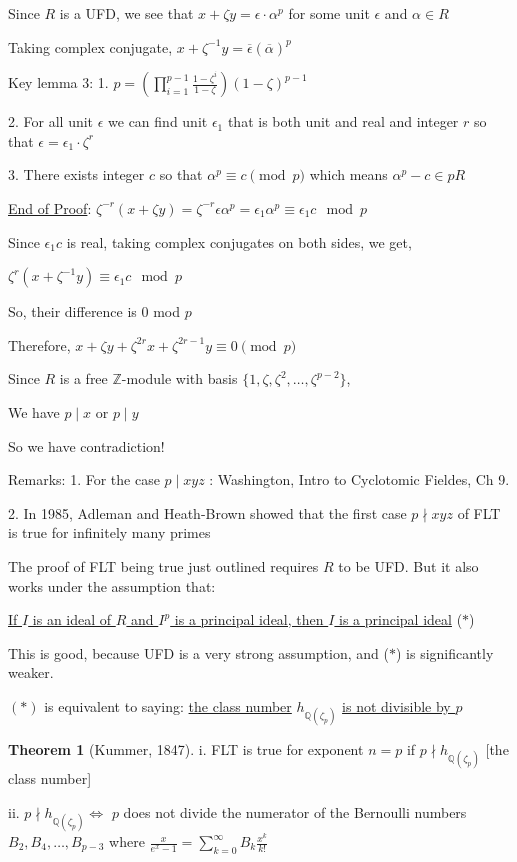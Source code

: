 \documentclass[openany]{amsbook}
\numberwithin{section}{chapter}
\theoremstyle{definition}
\newtheorem{theorem}{Theorem}[chapter]
\begin{document}
Since \(R\) is a UFD, we see that \(x + \zeta y = \epsilon \cdot \alpha ^p\) for some unit \(\epsilon \) and \(\alpha \in R\) 

Taking complex conjugate, \(x + \zeta^{-1} y = \overline{\epsilon} (\overline{\alpha})^p\)

Key lemma 3: 1. \(p = (\prod_{i=1}^{p-1} \frac{1-\zeta^i}{1-\zeta})(1-\zeta)^{p-1}\)

2. For all unit \(\epsilon\) we can find unit \(\epsilon_1\) that is both unit and real and integer \(r\) so that \(\epsilon = \epsilon _1 \cdot \zeta^r\) 

3. There exists integer \(c\) so that \(\alpha^p \equiv c \pmod p\) which means \(\alpha^p - c \in pR\) 

\underline{End of Proof}: \(\zeta ^{-r}(x + \zeta y) = \zeta ^{-r} \epsilon \alpha^p = \epsilon_1 \alpha^p \equiv \epsilon_1 c \mod p\) 

Since \(\epsilon _1 c\) is real, taking complex conjugates on both sides, we get,

\(\zeta ^r (x + \zeta ^{-1} y) \equiv \epsilon_1 c \mod p\) 

So, their difference is \(0\) mod \(p\) 

Therefore, \(x + \zeta y + \zeta^{2r} x + \zeta^{2r-1} y \equiv 0 \pmod p\) 

Since \(R\) is a free \(\mathbb{Z}\)-module with basis \(\{ 1, \zeta , \zeta ^2, \dots , \zeta ^{p-2} \} \),

We have \(p \mid x\) or \(p \mid y\) 

So we have contradiction!

Remarks: 1. For the case \(p \mid xyz\) : Washington, Intro to Cyclotomic Fieldes, Ch 9.

2. In 1985, Adleman and Heath-Brown showed that the first case \(p \nmid xyz\) of FLT is true for infinitely many primes

The proof of FLT being true just outlined requires \(R\) to be UFD. But it also works under the assumption that:

\underline{If \(I\) is an ideal of \(R\) and \(I^p\) is a principal ideal, then \(I\) is a principal ideal} (\(\ast\)) 

This is good, because UFD is a very strong assumption, and (\(\ast\)) is significantly weaker.

\((\ast)\) is equivalent to saying: \underline{the class number} \( h_{\mathbb{Q}(\zeta_p)}\) \underline{is not divisible by } \(p\)

\begin{theorem}
    [Kummer, 1847]

    i. FLT is true for exponent \(n = p\) if \(p \nmid h_{\mathbb{Q}(\zeta_p)}\) [the class number]

    ii. \(p \nmid h_{\mathbb{Q}(\zeta_p)} \iff\) \(p\) does not divide the numerator of the Bernoulli numbers \(B_2, B_4, \dots , B_{p-3}\) where \(\frac{x}{e^x - 1} = \sum_{k=0}^{\infty} B_k \frac{x^k}{k!}\) 
\end{theorem}
\end{document}
